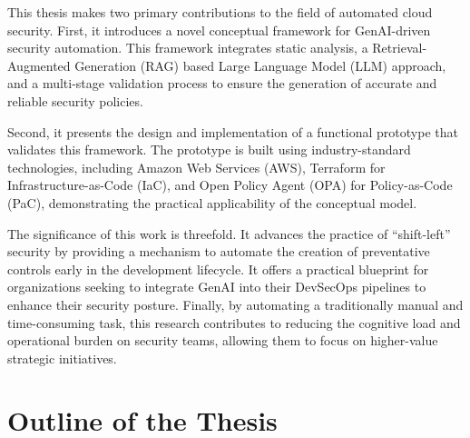 This thesis makes two primary contributions to the field of automated cloud security. First, it introduces a novel conceptual framework for GenAI-driven security automation. This framework integrates static analysis, a Retrieval-Augmented Generation (RAG) based Large Language Model (LLM) approach, and a multi-stage validation process to ensure the generation of accurate and reliable security policies.

Second, it presents the design and implementation of a functional prototype that validates this framework. The prototype is built using industry-standard technologies, including Amazon Web Services (AWS), Terraform for Infrastructure-as-Code (IaC), and Open Policy Agent (OPA) for Policy-as-Code (PaC), demonstrating the practical applicability of the conceptual model.

The significance of this work is threefold. It advances the practice of ``shift-left'' security by providing a mechanism to automate the creation of preventative controls early in the development lifecycle. It offers a practical blueprint for organizations seeking to integrate GenAI into their DevSecOps pipelines to enhance their security posture. Finally, by automating a traditionally manual and time-consuming task, this research contributes to reducing the cognitive load and operational burden on security teams, allowing them to focus on higher-value strategic initiatives.

\section{Outline of the Thesis}
\label{sec:outline}

